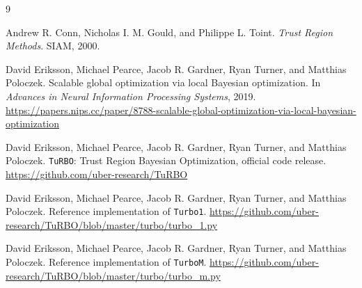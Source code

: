 \documentclass[10pt]{article}
\numberwithin{equation}{section}
\newcommand{\TuRBO}{\textnormal{\texttt{TuRBO}}}
\newcommand{\TurboOne}{\textnormal{\texttt{Turbo1}}}
\newcommand{\TurboM}{\textnormal{\texttt{TurboM}}}
\theoremstyle{plain}
\theoremstyle{definition}
\theoremstyle{remark}
\begin{document}
\begin{thebibliography}{9}
\raggedright
\small

Andrew R. Conn, Nicholas I. M. Gould, and Philippe L. Toint.
\newblock \emph{Trust Region Methods}.
\newblock SIAM, 2000.

David Eriksson, Michael Pearce, Jacob R. Gardner, Ryan Turner, and Matthias
Poloczek.
\newblock Scalable global optimization via local Bayesian optimization.
\newblock In \emph{Advances in Neural Information Processing Systems}, 2019.
\newblock \url{https://papers.nips.cc/paper/8788-scalable-global-optimization-via-local-bayesian-optimization}

David Eriksson, Michael Pearce, Jacob R. Gardner, Ryan Turner, and Matthias
Poloczek.
\newblock \TuRBO: Trust Region Bayesian Optimization, official code release.
\newblock \url{https://github.com/uber-research/TuRBO}

David Eriksson, Michael Pearce, Jacob R. Gardner, Ryan Turner, and Matthias
Poloczek.
\newblock Reference implementation of \TurboOne.
\newblock \url{https://github.com/uber-research/TuRBO/blob/master/turbo/turbo_1.py}

David Eriksson, Michael Pearce, Jacob R. Gardner, Ryan Turner, and Matthias
Poloczek.
\newblock Reference implementation of \TurboM.
\newblock \url{https://github.com/uber-research/TuRBO/blob/master/turbo/turbo_m.py}

\end{thebibliography}
\end{document}
